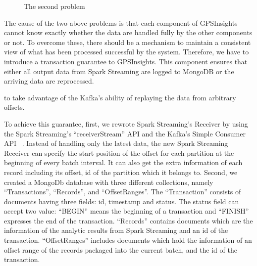 \documentclass{acm_proc_article-sp}
\begin{document}
\begin{figure}[h]
\centering
{}
\caption{The second problem}
\end{figure} 

The cause of the two above problems is that each component of GPSInsights cannot know exactly whether the data are handled fully by the other components or not. To overcome these, there should be a mechanism to maintain a consistent view of what has been processed successful by the system. Therefore, we have to introduce a transaction guarantee to GPSInsights. This component ensures that either all output data from Spark Streaming are logged to MongoDB or the arriving data are reprocessed.

to take advantage of the Kafka's ability of replaying the data from arbitrary offsets.

To achieve this guarantee, first, we rewrote Spark Streaming's Receiver by using the Spark Streaming's ``receiverStream'' API and the Kafka's Simple Consumer API ~\cite{kafkasimpleapi}. Instead of handling only the latest data, the new Spark Streaming Receiver can specify the start position of the offset for each partition at the beginning of every batch interval. It can also get the extra information of each record including its offset, id of the partition which it belongs to. Second, we created a MongoDb database with three different collections, namely ``Transactions'', ``Records'', and ``OffsetRanges''. The ``Transaction'' consists of documents having three fields: id, timestamp and status. The status field can accept two value: ``BEGIN'' means the beginning of a transaction and ``FINISH'' expresses the end of the transaction. ``Records'' contains documents which are the information of the analytic results from Spark Streaming and an id of the transaction. ``OffsetRanges'' includes documents which hold the information of an offset range of the records packaged into the current batch, and the id of the transaction.
\end{document}
